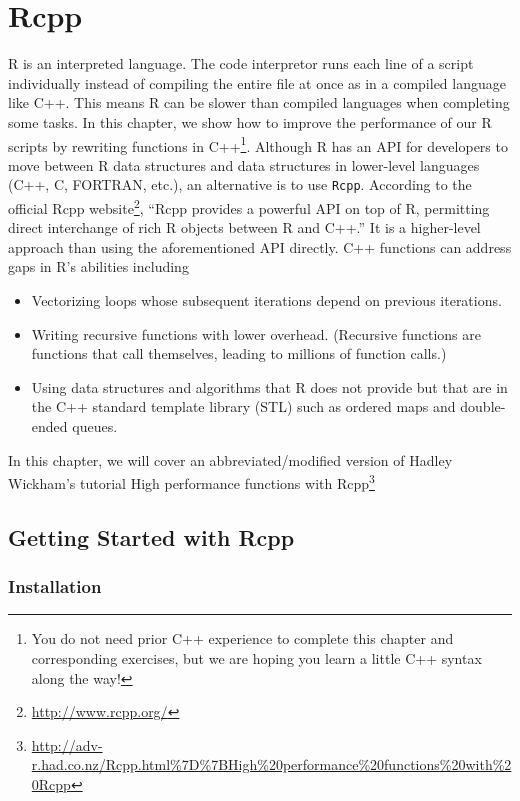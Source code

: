 \documentclass[]{krantz}
\providecommand{\tightlist}{%
  \setlength{\itemsep}{0pt}\setlength{\parskip}{0pt}}
\renewcommand{\href}[2]{#2\footnote{\url{#1}}}
\begin{document}
\chapter{Rcpp}\label{rcpp}

R is an interpreted language. The code interpretor runs each line of a
script individually instead of compiling the entire file at once as in a
compiled language like C++. This means R can be slower than compiled
languages when completing some tasks. In this chapter, we show how to
improve the performance of our R scripts by rewriting functions in
C++\footnote{You do not need prior C++ experience to complete this
  chapter and corresponding exercises, but we are hoping you learn a
  little C++ syntax along the way!}. Although R has an API for
developers to move between R data structures and data structures in
lower-level languages (C++, C, FORTRAN, etc.), an alternative is to use
\texttt{Rcpp}. According to the \href{http://www.rcpp.org/}{official
Rcpp website}, ``Rcpp provides a powerful API on top of R, permitting
direct interchange of rich R objects between R and C++.'' It is a
higher-level approach than using the aforementioned API directly. C++
functions can address gaps in R's abilities including

\begin{itemize}
\tightlist
\item
  Vectorizing loops whose subsequent iterations depend on previous
  iterations.
\item
  Writing recursive functions with lower overhead. (Recursive functions
  are functions that call themselves, leading to millions of function
  calls.)
\item
  Using data structures and algorithms that R does not provide but that
  are in the C++ standard template library (STL) such as ordered maps
  and double-ended queues.
\end{itemize}

In this chapter, we will cover an abbreviated/modified version of Hadley
Wickham's tutorial
\href{http://adv-r.had.co.nz/Rcpp.html\%7D\%7BHigh\%20performance\%20functions\%20with\%20Rcpp}{High
performance functions with Rcpp}

\section{Getting Started with Rcpp}\label{getting-started-with-rcpp}

\subsection{Installation}\label{installation}
\end{document}
